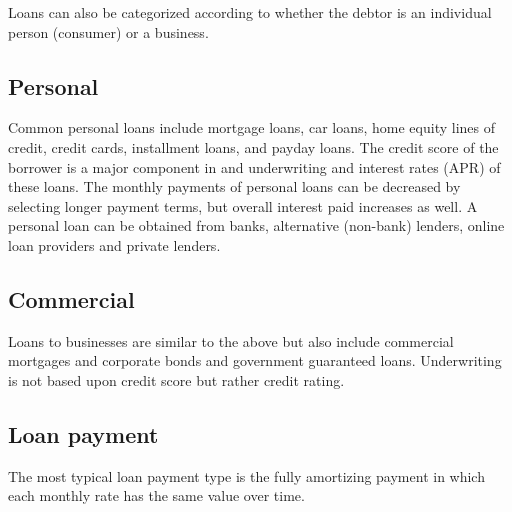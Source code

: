 Loans can also be categorized according to whether the debtor is an individual person
(consumer) or a business.




\subsection{Personal}
\label{sss:pers-0be5}




Common personal loans include mortgage loans, car loans, home equity lines of credit,
credit cards, installment loans, and payday loans. The credit score of the borrower is a
major component in and underwriting and interest rates (APR) of these loans. The monthly
payments of personal loans can be decreased by selecting longer payment terms, but overall
interest paid increases as well. A personal loan can be obtained from banks, alternative
(non-bank) lenders, online loan providers and private lenders.




\subsection{Commercial}
\label{sss:comm-df23}




Loans to businesses are similar to the above but also include commercial mortgages and
corporate bonds and government guaranteed loans. Underwriting is not based upon credit
score but rather credit rating.




\subsection{Loan payment}
\label{sss:loan-e10e}




The most typical loan payment type is the fully amortizing payment in which each monthly
rate has the same value over time.



